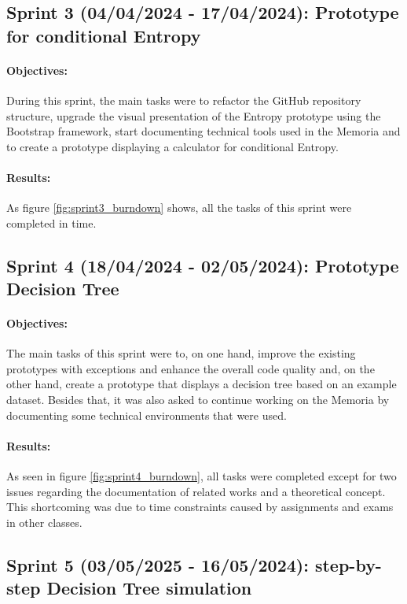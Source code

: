 \subsection{Sprint 3 (04/04/2024 - 17/04/2024): Prototype for conditional Entropy}
\paragraph{Objectives:}
During this sprint, the main tasks were to refactor the GitHub repository structure, upgrade the visual presentation of the Entropy prototype using the Bootstrap framework, start documenting technical tools used in the Memoria and to create a prototype displaying a calculator for conditional Entropy.

\paragraph{Results:}
As figure \ref{fig:sprint3_burndown} shows, all the tasks of this sprint were completed in time.

\subsection{Sprint 4 (18/04/2024 - 02/05/2024): Prototype Decision Tree}
\paragraph{Objectives:}
The main tasks of this sprint were to, on one hand, improve the existing prototypes with exceptions and enhance the overall code quality and, on the other hand, create a prototype that displays a decision tree based on an example dataset. Besides that, it was also asked to continue working on the Memoria by documenting some technical environments that were used.

\paragraph{Results:}
As seen in figure \ref{fig:sprint4_burndown}, all tasks were completed except for two issues regarding the documentation of related works and a theoretical concept. This shortcoming was due to time constraints caused by assignments and exams in other classes.

\subsection{Sprint 5 (03/05/2025 - 16/05/2024): step-by-step Decision Tree simulation}
